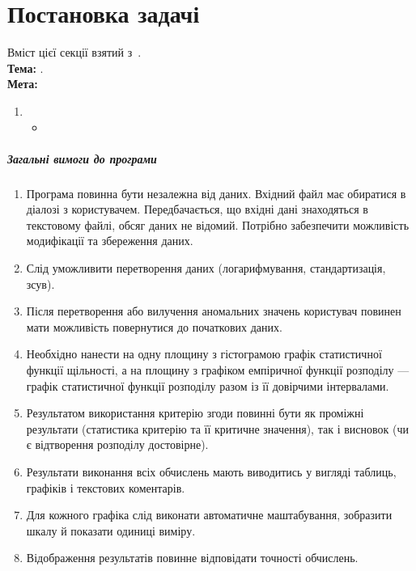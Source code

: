 \documentclass[../../document]{subfiles}
\begin{document}
\BeforeChpater{}

\chapter{Постановка задачі}
Вміст цієї секції взятий з~\cite{pristavka:matstat}.\\
\textbf{Тема:} \worktheme.\\
\textbf{Мета:} 
\begin{enumerate}
	\item
		\begin{itemize}
			\item 
		\end{itemize}
\end{enumerate}

\paragraph*{Загальні вимоги до програми}
\begin{enumerate}
	\item Програма повинна бути незалежна від даних. Вхідний файл має
		обиратися в діалозі з користувачем. Передбачається, що вхідні дані знаходяться
		в текстовому файлі, обсяг даних не відомий. Потрібно забезпечити можливість
		модифікації та збереження даних.
	\item Слід уможливити перетворення даних (логарифмування,
		стандартизація, зсув).
	\item Після перетворення або вилучення аномальних значень користувач
		повинен мати можливість повернутися до початкових даних.
	\item Необхідно нанести на одну площину з гістограмою графік статистичної
		функції щільності, а на площину з графіком емпіричної функції розподілу ---
		графік статистичної функції розподілу разом із її довірчими інтервалами.
	\item Результатом використання критерію згоди повинні бути як проміжні
		результати (статистика критерію та її критичне значення), так і висновок (чи є
		відтворення розподілу достовірне).
	\item Результати виконання всіх обчислень мають виводитись у вигляді
		таблиць, графіків і текстових коментарів.
	\item Для кожного графіка слід виконати автоматичне маштабування,
		зобразити шкалу й показати одиниці виміру.
	\item Відображення результатів повинне відповідати точності обчислень.
\end{enumerate}

\AfterChapter{}
\end{document}
